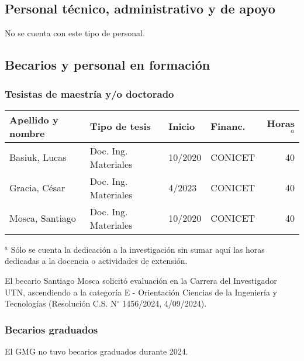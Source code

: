 \documentclass[a4paper,11pt,twoside,final,titlepage,onecolumn,openright]{report}
\begin{document}
\subsection{Personal técnico, administrativo y de apoyo}
No se cuenta con este tipo de personal.


\subsection{Becarios y personal en formación}

\subsubsection{Tesistas de maestría y/o doctorado}
\begin{tabular}{l l l l r}
\toprule
Apellido y nombre & Tipo de tesis & Inicio & Financ. & Horas$^a$ \\
\midrule
Basiuk, Lucas & Doc. Ing. Materiales & 10/2020 &  CONICET & 40 \\
Gracia, César & Doc. Ing. Materiales & 4/2023 &  CONICET & 40 \\
Mosca, Santiago & Doc. Ing. Materiales & 10/2020 &  CONICET & 40\\
\bottomrule
\end{tabular}

\normalsize
\vspace{0.5cm}
$^a$ Sólo se cuenta la dedicación a la investigación sin sumar aquí las horas dedicadas a la docencia o actividades de extensión.

El becario Santiago Mosca solicitó evaluación en la Carrera del Investigador UTN, ascendiendo a la categoría E - Orientación Ciencias de la Ingeniería y Tecnologías (Resolución C.S. N$^{\circ}$ 1456/2024, 4/09/2024).

\subsubsection{Becarios graduados}

El GMG no tuvo becarios graduados durante 2024.
%
\end{document}
